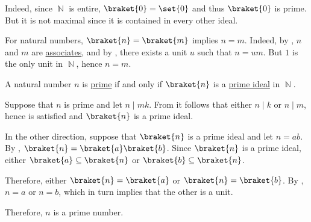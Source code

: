 \begin{example}
\begin{thmenum}
    Indeed, since \( \BbbN \) is entire, \( \braket{ 0 } = \set{ 0 } \) and thus \( \braket{ 0 } \) is prime. But it is not maximal since it is contained in every other ideal.

     For natural numbers, \( \braket{ n } = \braket{ m } \) implies \( n = m \). Indeed, by , \( n \) and \( m \) are \hyperref[def:divisibility/associates]{associates}, and by , there exists a unit \( u \) such that \( n = um \). But \( 1 \) is the only unit in \( \BbbN \), hence \( n = m \).

     A natural number \( n \) is \hyperref[def:prime_number]{prime} if and only if \( \braket{n} \) is a \hyperref[def:semiring_ideal/prime]{prime ideal} in \( \BbbN \).

    Suppose that \( n \) is prime and let \( n \mid mk \). From  it follows that either \( n \mid k \) or \( n \mid m \), hence  is satisfied and \( \braket{ n } \) is a prime ideal.

    In the other direction, suppose that \( \braket{ n } \) is a prime ideal and let \( n = ab \). By , \( \braket{ n } = \braket{ a } \braket{ b } \). Since \( \braket{ n } \) is a prime ideal, either \( \braket{ a } \subseteq \braket{ n } \) or \( \braket{ b } \subseteq \braket{ n } \).

    Therefore, either \( \braket{ n } = \braket{ a } \) or \( \braket{ n } = \braket{ b } \). By , \( n = a \) or \( n = b \), which in turn implies that the other is a unit.

    Therefore, \( n \) is a prime number.
  \end{thmenum}
\end{example}

